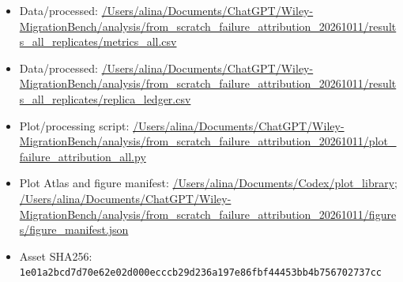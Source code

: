 \begin{itemize}[leftmargin=1.4em,noitemsep]
\item Data/processed: \begingroup\scriptsize\url{/Users/alina/Documents/ChatGPT/Wiley-MigrationBench/analysis/from_scratch_failure_attribution_20261011/results_all_replicates/metrics_all.csv}\endgroup
\item Data/processed: \begingroup\scriptsize\url{/Users/alina/Documents/ChatGPT/Wiley-MigrationBench/analysis/from_scratch_failure_attribution_20261011/results_all_replicates/replica_ledger.csv}\endgroup
\item Plot/processing script: \begingroup\scriptsize\url{/Users/alina/Documents/ChatGPT/Wiley-MigrationBench/analysis/from_scratch_failure_attribution_20261011/plot_failure_attribution_all.py}\endgroup
\item Plot Atlas and figure manifest: \begingroup\scriptsize\url{/Users/alina/Documents/Codex/plot_library}\endgroup; \url{/Users/alina/Documents/ChatGPT/Wiley-MigrationBench/analysis/from_scratch_failure_attribution_20261011/figures/figure_manifest.json}
\item Asset SHA256: \texttt{1e01a2bcd7d70e62e02d000ecccb29d236a197e86fbf44453bb4b756702737cc}
\end{itemize}
